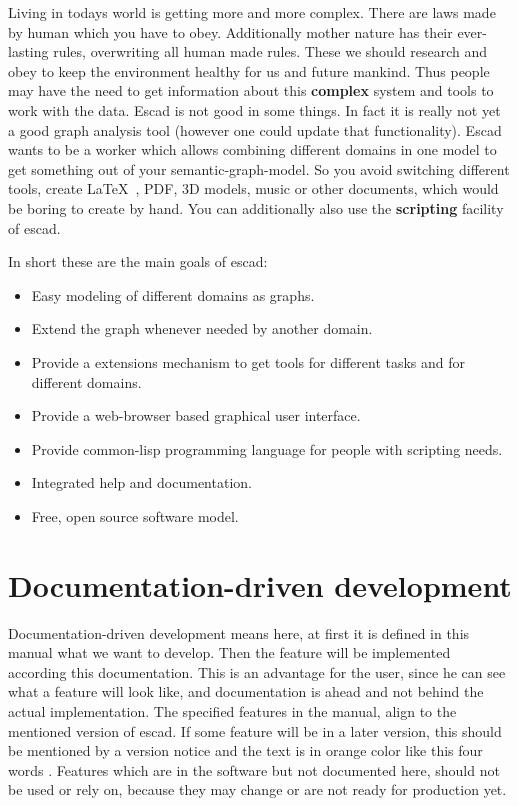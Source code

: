 \documentclass[a4paper, 12pt, openany]{scrbook}
\begin{document}
Living in todays world is getting more and more complex. There are laws made by human which you have to obey. Additionally mother nature has their ever-lasting rules, overwriting all human made rules. These we should research and obey to keep the environment healthy for us and future mankind. Thus people may have the need to get information about this \textbf{complex} system and tools to work with the data. Escad is not good in some things. In fact it is really not yet a good graph analysis tool (however one could update that functionality). Escad wants to be a worker which allows combining different domains in one model to get something out of your semantic-graph-model. So you avoid switching different tools, create \LaTeX\ , PDF, 3D models, music or other documents, which would be boring to create by hand. You can additionally also use the \textbf{scripting} facility of escad.

In short these are the main goals of escad:
\begin{itemize}
\item Easy modeling of different domains as graphs.
\item Extend the graph whenever needed by another domain.
\item Provide a extensions mechanism to get tools for different tasks and for different domains.
\item Provide a web-browser based graphical user interface.
\item Provide common-lisp programming language for people with scripting needs.
\item Integrated help and documentation.
\item Free, open source software model.
\end{itemize}
\section{Documentation-driven development}\label{sec:ddd}
Documentation-driven development means here, at first it is defined in this manual what we want to develop. Then the feature will be implemented according this documentation. This is an advantage for the user, since he can see what a feature will look like, and documentation is ahead and not behind the actual implementation. The specified features in the manual, align to the mentioned version of escad. If some feature will be in a later version, this should be mentioned by a version notice and the text is in orange color \color{orange} like this four words \color{black}. Features which are in the software but not documented here, should not be used or rely on, because they may change or are not ready for production yet.
\end{document}
